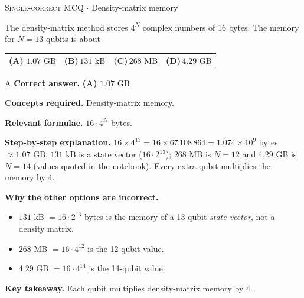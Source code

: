 \documentclass[11pt,a4paper]{article}
\newcommand{\optlabel}[1]{\textbf{(#1)}}
\newcommand{\correctlabel}[1]{\textcolor{okgreen}{\textbf{(#1)}\,\ding{51}}}
\newenvironment{qitem}[1]{\begin{list}{}{\setlength{\leftmargin}{3.3em}\setlength{\labelwidth}{3.1em}%
  \setlength{\labelsep}{0.2em}\setlength{\topsep}{3pt}\setlength{\parsep}{3pt}}\item[\textbf{Q.#1}\hfill]}{\end{list}}
\newcommand{\qsep}{\par\vspace{2pt}{\color{black!15}\hrule}\vspace{4pt}}
\newcommand{\qmeta}[2]{{\footnotesize\color{black!60}\textsc{#1} \;$\cdot$\; #2}\par}
\begin{document}
\begin{qitem}{48}
\qmeta{Single-correct MCQ}{Density-matrix memory}
The density-matrix method stores $4^N$ complex numbers of 16 bytes. The memory for $N = 13$ qubits is about
\par\smallskip\noindent\begin{tabularx}{\linewidth}{@{}*{4}{L}@{}}
\correctlabel{A}\,$1.07$ GB & \optlabel{B}\,$131$ kB & \optlabel{C}\,$268$ MB & \optlabel{D}\,$4.29$ GB
\end{tabularx}
\end{qitem}
\begin{solbox}{A}
\textbf{\color{brand}Correct answer.} \textcolor{okgreen}{\textbf{(A)}} $1.07$ GB

\textbf{\color{brand}Concepts required.} Density-matrix memory.

\textbf{\color{brand}Relevant formulae.} $16\cdot4^N$ bytes.

\textbf{\color{brand}Step-by-step explanation.} $16\times4^{13} = 16\times67\,108\,864 = 1.074\times10^9$ bytes $\approx 1.07$ GB. $131$ kB is a state vector ($16\cdot2^{13}$); $268$ MB is $N = 12$ and
$4.29$ GB is $N = 14$ (values quoted in the notebook). Every extra qubit multiplies the memory by 4.

\textbf{\color{brand}Why the other options are incorrect.}
\begin{itemize}[leftmargin=2.4em, itemsep=1pt, topsep=2pt]
\item[\textbf{(B)}] $131$ kB $= 16\cdot2^{13}$ bytes is the memory of a 13-qubit \emph{state vector}, not a density matrix.
\item[\textbf{(C)}] $268$ MB $= 16\cdot4^{12}$ is the 12-qubit value.
\item[\textbf{(D)}] $4.29$ GB $= 16\cdot4^{14}$ is the 14-qubit value.
\end{itemize}
\textbf{\color{brand}Key takeaway.} Each qubit multiplies density-matrix memory by 4.
\end{solbox}
\qsep
\end{document}
